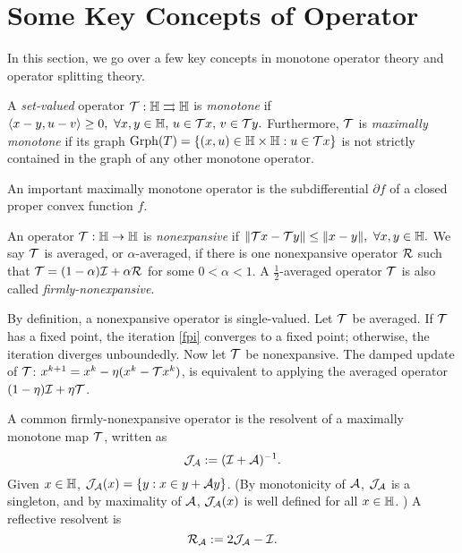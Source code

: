 \section{Some Key Concepts of Operator}\label{sec:op-concept}
In this section, we go over a few key concepts in monotone operator theory and operator splitting theory.

\begin{definition}\label{def:max-mon-op}
A \emph{set-valued} operator ${\mathcal{T}}:\mathbb{H}\rightrightarrows\mathbb{H}$ is \emph{monotone} if
$\langle x-y, u-v\rangle\ge 0,\ \forall x,y\in\mathbb{H},\, u\in {\mathcal{T}} x,\, v\in{\mathcal{T}} y.$
Furthermore, ${\mathcal{T}}$ is \emph{maximally monotone} if its graph $\mathrm{Grph}(T)=\{(x,u)\in \mathbb{H}\times\mathbb{H}: u\in {\mathcal{T}} x\}$ is not strictly contained in the graph of any other monotone operator. 
\end{definition}

\begin{example}\label{exmp:mon-op}
An important maximally monotone operator is the subdifferential $\partial f$ of a closed proper convex function $f$.
\end{example}

\begin{definition}
An operator ${\mathcal{T}}:\mathbb{H}\to\mathbb{H}$ is \emph{nonexpansive} if
$\|{\mathcal{T}} x-{\mathcal{T}} y\|\le\|x-y\|,\ \forall x, y\in\mathbb{H}.$ We say ${\mathcal{T}}$ is averaged, or $\alpha$-averaged, if there is one nonexpansive operator ${\mathcal{R}}$ such that ${\mathcal{T}}=(1-\alpha){\mathcal{I}}+\alpha{\mathcal{R}}$ for some $0<\alpha<1$.  A $\frac{1}{2}$-averaged operator ${\mathcal{T}}$ is also called \emph{firmly-nonexpansive}.
\end{definition}
By definition, a nonexpansive operator is single-valued. Let ${\mathcal{T}}$ be averaged. If ${\mathcal{T}}$ has a fixed point, the iteration \eqref{fpi} converges to a fixed point; otherwise, the iteration diverges unboundedly. Now let  ${\mathcal{T}}$ be nonexpansive. The damped update of ${\mathcal{T}}$: $x^{k+1} = x^k-\eta(x^k- {\mathcal{T}} x^k)$, is equivalent to applying the averaged operator $(1-\eta){\mathcal{I}}+\eta{\mathcal{T}}$. 

\begin{example}
A common firmly-nonexpansive operator is the resolvent of a maximally monotone map ${\mathcal{T}}$, written as 
\begin{equation}\label{def-resolvent}\cJ_\cA := (\cI+\cA)^{-1}.
\end{equation} Given $x\in\mathbb{H}$, ${\mathcal{J}}_{\mathcal{A}}(x) =  \{y:x\in y+{\mathcal{A}} y\}$. (By monotonicity of ${\mathcal{A}}$, ${\mathcal{J}}_{\mathcal{A}}$ is a singleton, and by maximality of ${\mathcal{A}}$, ${\mathcal{J}}_{\mathcal{A}}(x)$ is well defined for all $x\in\mathbb{H}$. ) A reflective resolvent is \begin{equation}\label{def-ref}\cR_{\cA}:= 2\cJ_\cA-\cI.
\end{equation}
\end{example}

